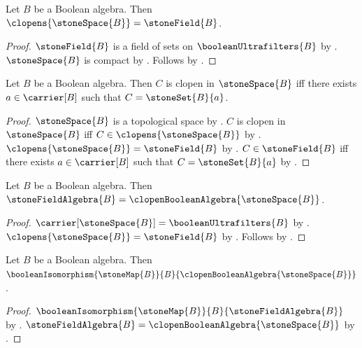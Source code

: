 \begin{theorem}\label{stone_space_clopens_eq_stone_field}
    Let $B$ be a Boolean algebra.
    Then $\clopens{\stoneSpace{B}}=\stoneField{B}$.
\end{theorem}
\begin{proof}
    $\stoneField{B}$ is a field of sets on
        $\booleanUltrafilters{B}$ by
        .
    $\stoneSpace{B}$ is compact by .
    Follows by
        .
\end{proof}

\begin{theorem}\label{stone_space_clopen_iff_stone_set}
    Let $B$ be a Boolean algebra.
    Then $C$ is clopen in $\stoneSpace{B}$ iff
        there exists $a\in\carrier[B]$ such that
            $C=\stoneSet{B}{a}$.
\end{theorem}
\begin{proof}
    $\stoneSpace{B}$ is a topological space by
        .
    $C$ is clopen in $\stoneSpace{B}$ iff
        $C\in\clopens{\stoneSpace{B}}$ by .
    $\clopens{\stoneSpace{B}}=\stoneField{B}$ by
        .
    $C\in\stoneField{B}$ iff
        there exists $a\in\carrier[B]$ such that
            $C=\stoneSet{B}{a}$ by .
\end{proof}

\begin{theorem}\label{stone_field_algebra_eq_clopen_boolean_algebra}
    Let $B$ be a Boolean algebra.
    Then $\stoneFieldAlgebra{B}=
        \clopenBooleanAlgebra{\stoneSpace{B}}$.
\end{theorem}
\begin{proof}
    $\carrier[\stoneSpace{B}]=\booleanUltrafilters{B}$ by
        .
    $\clopens{\stoneSpace{B}}=\stoneField{B}$ by
        .
    Follows by
        .
\end{proof}

\begin{theorem}\label{stone_clopen_representation}
    Let $B$ be a Boolean algebra.
    Then $\booleanIsomorphism
        {\stoneMap{B}}{B}
        {\clopenBooleanAlgebra{\stoneSpace{B}}}$.
\end{theorem}
\begin{proof}
    $\booleanIsomorphism
        {\stoneMap{B}}{B}{\stoneFieldAlgebra{B}}$ by
        .
    $\stoneFieldAlgebra{B}=
        \clopenBooleanAlgebra{\stoneSpace{B}}$ by
        .
\end{proof}
